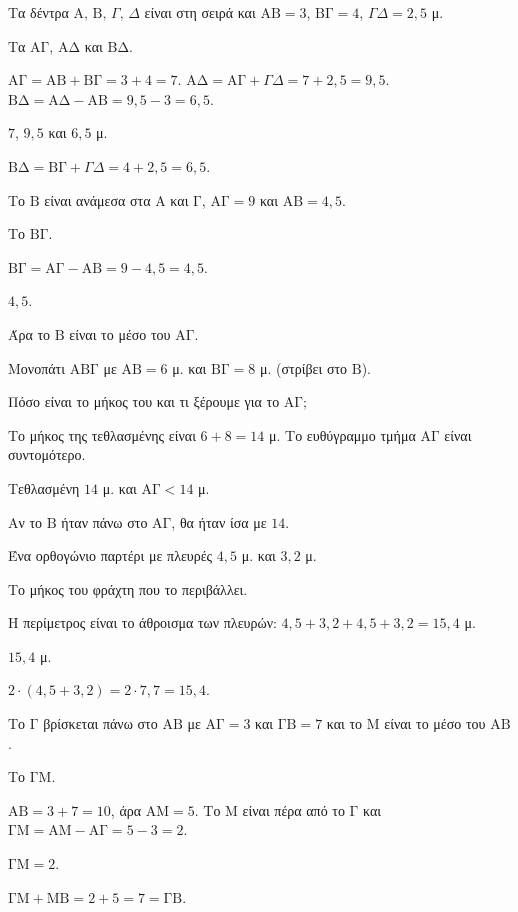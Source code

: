 
\tixero Τα δέντρα $\mathrm{Α},\,\mathrm{Β},\,\Gamma,\,\Delta$ είναι στη σειρά και $\mathrm{ΑΒ}=3$, $\mathrm{ΒΓ}=4$, $\Gamma\Delta=2{,}5$ μ.\par
\tithelo Τα $\mathrm{ΑΓ}$, $\mathrm{ΑΔ}$ και $\mathrm{ΒΔ}$.\par
\possindeo $\mathrm{ΑΓ}=\mathrm{ΑΒ}+\mathrm{ΒΓ}=3+4=7$. $\mathrm{ΑΔ}=\mathrm{ΑΓ}+\Gamma\Delta=7+2{,}5=9{,}5$. $\mathrm{ΒΔ}=\mathrm{ΑΔ}-\mathrm{ΑΒ}=9{,}5-3=6{,}5$.\par
\apantisi $7$, $9{,}5$ και $6{,}5$ μ.\par
\elegxos $\mathrm{ΒΔ}=\mathrm{ΒΓ}+\Gamma\Delta=4+2{,}5=6{,}5$.

\tixero Το $\mathrm{Β}$ είναι ανάμεσα στα $\mathrm{Α}$ και $\mathrm{Γ}$, $\mathrm{ΑΓ}=9$ και $\mathrm{ΑΒ}=4{,}5$.\par
\tithelo Το $\mathrm{ΒΓ}$.\par
\possindeo $\mathrm{ΒΓ}=\mathrm{ΑΓ}-\mathrm{ΑΒ}=9-4{,}5=4{,}5$.\par
\apantisi $4{,}5$.\par
\elegxos Άρα το $\mathrm{Β}$ είναι το μέσο του $\mathrm{ΑΓ}$.

\tixero Μονοπάτι $\mathrm{ΑΒΓ}$ με $\mathrm{ΑΒ}=6$ μ. και $\mathrm{ΒΓ}=8$ μ. (στρίβει στο $\mathrm{Β}$).\par
\tithelo Πόσο είναι το μήκος του και τι ξέρουμε για το $\mathrm{ΑΓ}$;\par
\possindeo Το μήκος της τεθλασμένης είναι $6+8=14$ μ. Το ευθύγραμμο τμήμα $\mathrm{ΑΓ}$ είναι συντομότερο.\par
\apantisi Τεθλασμένη $14$ μ. και $\mathrm{ΑΓ}<14$ μ.\par
\elegxos Αν το $\mathrm{Β}$ ήταν πάνω στο $\mathrm{ΑΓ}$, θα ήταν ίσα με $14$.

\tixero Ένα ορθογώνιο παρτέρι με πλευρές $4{,}5$ μ. και $3{,}2$ μ.\par
\tithelo Το μήκος του φράχτη που το περιβάλλει.\par
\possindeo Η περίμετρος είναι το άθροισμα των πλευρών: $4{,}5+3{,}2+4{,}5+3{,}2=15{,}4$ μ.\par
\apantisi $15{,}4$ μ.\par
\elegxos $2\cdot(4{,}5+3{,}2)=2\cdot7{,}7=15{,}4$.

\tixero Το $\mathrm{Γ}$ βρίσκεται πάνω στο $\mathrm{ΑΒ}$ με $\mathrm{ΑΓ}=3$ και $\mathrm{ΓΒ}=7$ και το $\mathrm{Μ}$ είναι το μέσο του $\mathrm{ΑΒ}$.\par
\tithelo Το $\mathrm{ΓΜ}$.\par
\possindeo $\mathrm{ΑΒ}=3+7=10$, άρα $\mathrm{ΑΜ}=5$. Το $\mathrm{Μ}$ είναι πέρα από το $\mathrm{Γ}$ και $\mathrm{ΓΜ}=\mathrm{ΑΜ}-\mathrm{ΑΓ}=5-3=2$.\par
\apantisi $\mathrm{ΓΜ}=2$.\par
\elegxos $\mathrm{ΓΜ}+\mathrm{ΜΒ}=2+5=7=\mathrm{ΓΒ}$.

